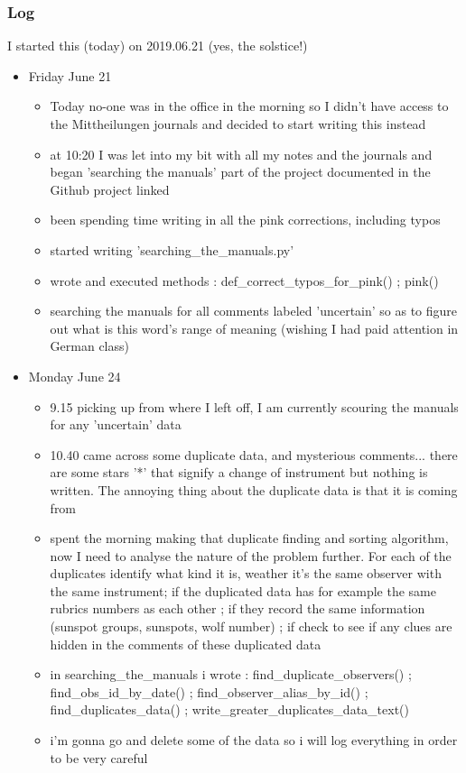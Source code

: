 \documentclass[12pt]{article}
\begin{document}
\subsubsection{Log}
I started this (today) on 2019.06.21 (yes, the solstice!)
\begin{itemize}
\item Friday June 21
    \begin{itemize}
        \item Today no-one was in the office in the morning so I didn't have access to the Mittheilungen journals and decided to start writing this instead
        \item at 10:20 I was let into my bit with all my notes and the journals and began 'searching the manuals' part of the project documented in the Github project linked
        \item been spending time writing in all the pink corrections, including typos
        \item started writing 'searching\_the\_manuals.py'
        \item wrote and executed methods : def\_correct\_typos\_for\_pink() ; pink()
        \item searching the manuals for all comments labeled 'uncertain' so as to figure out what is this word's range of meaning (wishing I had paid attention in German class)
    \end{itemize}
    
\item Monday June 24
    \begin{itemize}
        \item 9.15 picking up from where I left off, I am currently scouring the manuals for any 'uncertain' data
        \item 10.40 came across some duplicate data, and mysterious comments... there are some stars '*' that signify a change of instrument but nothing is written. The annoying thing about the duplicate data is that it is coming from 
        \item spent the morning making that duplicate finding and sorting algorithm, now I need to analyse the nature of the problem further. For each of the duplicates identify what kind it is, weather it's the same observer with the same instrument; if the duplicated data has for example the same rubrics numbers as each other ; if they record the same information (sunspot groups, sunspots, wolf number) ; if check to see if any clues are hidden in the comments of these duplicated data
        \item in searching\_the\_manuals i wrote : find\_duplicate\_observers() ; find\_obs\_id\_by\_date() ; find\_observer\_alias\_by\_id() ; find\_duplicates\_data() ; write\_greater\_duplicates\_data\_text()
        \item i'm gonna go and delete some of the data so i will log everything in order to be very careful
    \end{itemize}
    

\end{itemize}
\end{document}
